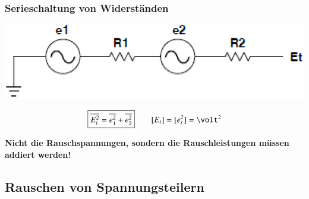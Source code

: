 

\subsubsection{Serieschaltung von Widerständen}

\begin{minipage}[c]{0.4\columnwidth}
    \includegraphics[width=\columnwidth]{images/serieschaltung_rauschende_widerstaende.png}
\end{minipage}
\hfill
\begin{minipage}[c]{0.58\columnwidth}
    $$ \boxed{ \overline{E_t^2} = \overline{e_1^2} + \overline{e_2^2} } \qquad [E_t] = [e_i^2] = \volt^2$$
\end{minipage}

\vspace{0.2cm}
\textbf{Nicht die Rauschspannungen, sondern die Rauschleistungen müssen addiert werden!} 


\subsection{Rauschen von Spannungsteilern}

